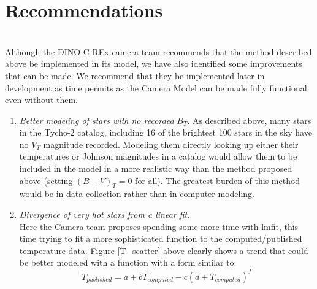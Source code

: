 \documentclass[]{DINOReportMemo}
\begin{document}
\section{Recommendations}  \\
Although the DINO C-REx camera team recommends that the method described above be implemented in its model, we have also identified some improvements that can be made. We recommend that they be implemented later in development as time permits as the Camera Model can be made fully functional even without them.
\begin{enumerate}
    \item \textit{Better modeling of stars with no recorded} $B_T$. As described above, many stars in the Tycho-2 catalog, including 16 of the brightest 100 stars in the sky have no $V_T$ magnitude recorded. Modeling them directly looking up either their temperatures or Johnson magnitudes in a catalog would allow them to be included in the model in a more realistic way than the method proposed above (setting $(B-V)_T=0$ for all). The greatest burden of this method would be in data collection rather than in computer modeling.
    \item \textit{Divergence of very hot stars from a linear fit}. \\
    Here the Camera team proposes spending some more time with lmfit, this time trying to fit a more sophisticated function to the computed/published temperature data. Figure \ref{T_scatter} above clearly shows a trend that could be better modeled with a function with a form similar to:
    \begin{equation}
        T_{published} = a + bT_{computed} - c(d + T_{computed})^f
    \end{equation}
\end{enumerate}
\end{document}
